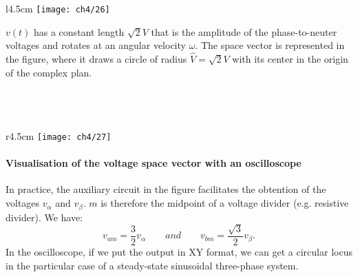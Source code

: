 		\begin{wrapfigure}[6]{l}{4.5cm}
		\vspace{-5mm}
		\texttt{[image: ch4/26]}
		\end{wrapfigure}
		$v(t)$ has a constant length $\sqrt{2}V$ that is the amplitude of the phase-to-neuter voltages and rotates at an angular velocity $\omega$. The space vector is represented in the figure, where it draws a circle of radius $\hat{V} =\sqrt{2}V$ with its center in the origin of the complex plan. \\\\\\\\
		
		\begin{wrapfigure}[6]{r}{4.5cm}
		\vspace{-5mm}
		\texttt{[image: ch4/27]}
		\end{wrapfigure}
		\paragraph{Visualisation of the voltage space vector with an oscilloscope} \quad In practice, the auxiliary circuit in the figure facilitates the obtention of the voltages $v_\alpha$ and $v_\beta$. $m$ is therefore the midpoint of a voltage divider (e.g. resistive divider). We have: 
		\begin{equation}
			v_{am} = \frac{3}{2}v_\alpha \qquad and \qquad v_{bm} = \frac{\sqrt{3}}{2}v_\beta . 
		\end{equation}
		In the oscilloscope, if we put the output in XY format, we can get a circular locus in the particular case of a steady-state sinusoidal three-phase system.
		
